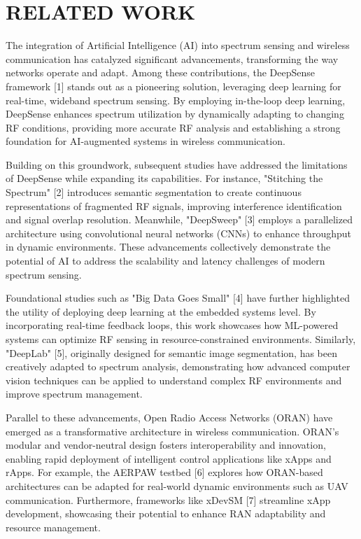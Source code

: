 \section{RELATED WORK}
The integration of Artificial Intelligence (AI) into spectrum sensing and wireless communication has catalyzed significant advancements, transforming the way networks operate and adapt. Among these contributions, the DeepSense framework [1] stands out as a pioneering solution, leveraging deep learning for real-time, wideband spectrum sensing. By employing in-the-loop deep learning, DeepSense enhances spectrum utilization by dynamically adapting to changing RF conditions, providing more accurate RF analysis and establishing a strong foundation for AI-augmented systems in wireless communication.

Building on this groundwork, subsequent studies have addressed the limitations of DeepSense while expanding its capabilities. For instance, "Stitching the Spectrum" [2] introduces semantic segmentation to create continuous representations of fragmented RF signals, improving interference identification and signal overlap resolution. Meanwhile, "DeepSweep" [3] employs a parallelized architecture using convolutional neural networks (CNNs) to enhance throughput in dynamic environments. These advancements collectively demonstrate the potential of AI to address the scalability and latency challenges of modern spectrum sensing.

Foundational studies such as "Big Data Goes Small" [4] have further highlighted the utility of deploying deep learning at the embedded systems level. By incorporating real-time feedback loops, this work showcases how ML-powered systems can optimize RF sensing in resource-constrained environments. Similarly, "DeepLab" [5], originally designed for semantic image segmentation, has been creatively adapted to spectrum analysis, demonstrating how advanced computer vision techniques can be applied to understand complex RF environments and improve spectrum management.

Parallel to these advancements, Open Radio Access Networks (ORAN) have emerged as a transformative architecture in wireless communication. ORAN’s modular and vendor-neutral design fosters interoperability and innovation, enabling rapid deployment of intelligent control applications like xApps and rApps. For example, the AERPAW testbed [6] explores how ORAN-based architectures can be adapted for real-world dynamic environments such as UAV communication. Furthermore, frameworks like xDevSM [7] streamline xApp development, showcasing their potential to enhance RAN adaptability and resource management.

